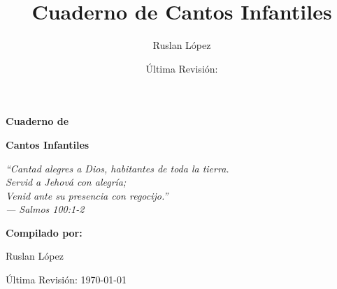 \documentclass[12pt, spanish]{book}
\title{Cuaderno de Cantos Infantiles}
\author{Ruslan L\'opez}
\date{\'Ultima Revisi\'on:  \RevDate}
\newcommand{\RevDate}{\today}
\begin{document}
    \hypersetup{pageanchor=false}

    \begin{titlepage}
        \centering

        \vspace*{1cm}

        {\Huge\bfseries\sffamily{$\dagger$}\par}

        \vspace{1.5cm}

        {\Huge\bfseries\sffamily Cuaderno de\par}
        \vspace{0.5cm}
        {\Huge\bfseries\sffamily Cantos Infantiles\par}

        \vspace{2cm}

        \begin{center}
            \Large\itshape ``Cantad alegres a Dios, habitantes de toda la tierra.\\
            Servid a Jehov\'a con alegr\'ia;\\
            Venid ante su presencia con regocijo.''\\
            \vspace{0.3cm}
            --- Salmos 100:1-2
        \end{center}

        \vspace{2cm}

        {\Large\bfseries Compilado por:\par}
        \vspace{0.5cm}
        {\Large Ruslan L\'opez\par}

        \vfill

        {\large \'Ultima Revisi\'on: \RevDate\par}

        \vspace{1cm}

    \end{titlepage}

    \hypersetup{pageanchor=true}
    \ifWordBk
    \twocolumn
    \fi
\end{document}
